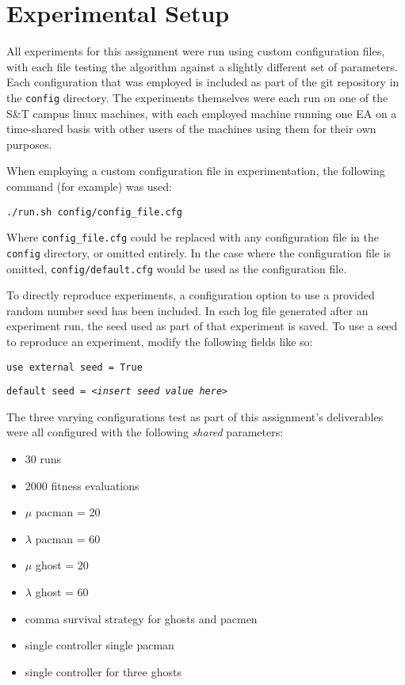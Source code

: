 \documentclass[11pt]{article}
\begin{document}
\section{Experimental Setup}
All experiments for this assignment were run using custom configuration files, with each file
testing the algorithm against a slightly different set of parameters. Each configuration that was employed is included
as part of the git repository in the \texttt{config} directory. The experiments themselves were each run on one of the S\&T campus
linux machines, with each employed machine running one EA on a time-shared basis with other users of the machines using them for their own
purposes. 

When employing a custom configuration file in experimentation, the following command (for example) was used:

\vspace{5mm}

{\centering \texttt{./run.sh config/config\_file.cfg}\par }

\vspace{5mm}

Where \texttt{config\_file.cfg} could be replaced with any configuration file in the \texttt{config} directory, or
omitted entirely. In the case where the configuration file is omitted, \texttt{config/default.cfg} would be used 
as the configuration file.

To directly reproduce experiments, a configuration option to use a provided random number seed has been included. In each log
file generated after an experiment run, the seed used as part of that experiment is saved. To use a seed to reproduce
an experiment, modify the following fields like so:

\vspace{5mm}

\texttt{use external seed = True}

\texttt{default seed = \textit{<insert seed value here>}}

\vspace{5mm}

The three varying configurations test as part of this assignment's deliverables were all configured with the following
\textit{shared} parameters:

\begin{itemize}
    \item 30 runs
    \item 2000 fitness evaluations
    \item \( \mu \) pacman = 20
    \item \( \lambda \) pacman = 60
    \item \( \mu \) ghost = 20
    \item \( \lambda \) ghost = 60
    \item comma survival strategy for ghosts and pacmen
    \item single controller single pacman
    \item single controller for three ghosts
\end{itemize}
\end{document}
